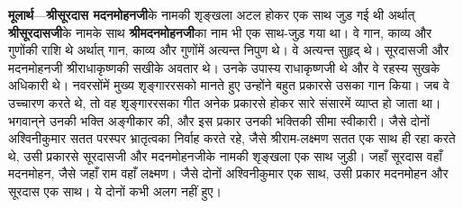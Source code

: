 \begin{sloppypar}\justifying{}
\textbf{मूलार्थ}—\textbf{श्रीसूरदास मदनमोहनजी}के नामकी शृङ्खला अटल होकर एक साथ जुड़ गई थी अर्थात् \textbf{श्रीसूरदासजी}के नामके साथ \textbf{श्रीमदनमोहनजी}का नाम भी एक साथ-जुड़ गया था। वे गान, काव्य और गुणोंकी राशि थे अर्थात् गान, काव्य और गुणोंमें अत्यन्त निपुण थे। वे अत्यन्त सुहृद् थे। सूरदासजी और मदनमोहनजी श्रीराधा\-कृष्णकी सखीके अवतार थे। उनके उपास्य राधा\-कृष्णजी थे और वे रहस्य सुखके अधिकारी थे। नवरसोंमें मुख्य शृङ्गार\-रसको मानते हुए उन्होंने बहुत प्रकारसे उसका गान किया। जब वे उच्चारण करते थे, तो वह शृङ्गार\-रसका गीत अनेक प्रकारसे होकर सारे संसारमें व्याप्त हो जाता था। भगवान्‌ने उनकी भक्ति अङ्गीकार की, और इस प्रकार उनकी भक्तिकी सीमा स्वीकारी। जैसे दोनों अश्विनीकुमार सतत परस्पर भ्रातृत्वका निर्वाह करते रहे, जैसे श्रीराम-लक्ष्मण सतत एक साथ ही रहा करते थे, उसी प्रकारसे सूरदासजी और मदनमोहनजीके नामकी शृङ्खला एक साथ जुड़ी। जहाँ सूरदास वहाँ मदनमोहन, जैसे जहाँ राम वहाँ लक्ष्मण। जैसे दोनों अश्विनीकुमार एक साथ, उसी प्रकार मदनमोहन और सूरदास एक साथ। ये दोनों कभी अलग नहीं हुए।
\end{sloppypar}


